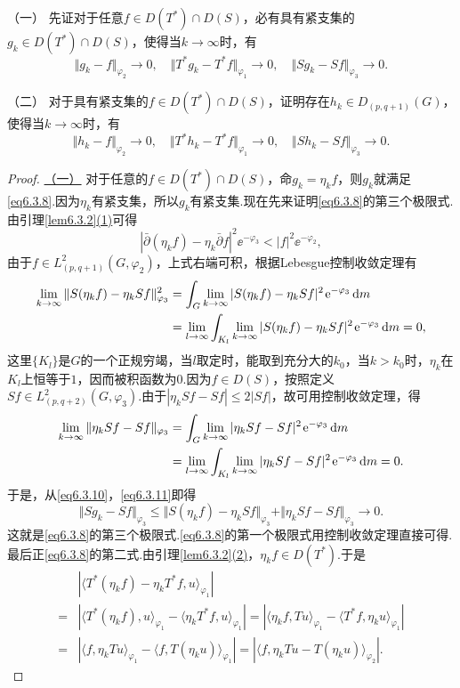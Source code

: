 （一）\hypertarget{6.3.4}{}
先证对于任意$f\in D(T^\ast)\cap D(S)$，必有具有紧支集的$g_k\in D(T^\ast)\cap D(S)$，使得当$k\to\infty$时，有
\begin{equation}\label{eq6.3.8}
	\Vert g_k-f\Vert_{\varphi_2}\to0,\quad\Vert T^\ast g_k-T^\ast f\Vert_{\varphi_1}\to0,\quad\Vert Sg_k-Sf\Vert_{\varphi_3}\to0.
\end{equation}

（二）\hypertarget{6.3.4}{}
对于具有紧支集的$f\in D(T^\ast)\cap D(S)$，证明存在$h_k\in D_{(p,q+1)}(G)$，使得当$k\to\infty$时，有
\begin{equation}\label{eq6.3.9}
	\Vert h_k-f\Vert_{\varphi_2}\to0,\quad\Vert T^\ast h_k-T^\ast f\Vert_{\varphi_1}\to0,\quad\Vert Sh_k-Sf\Vert_{\varphi_3}\to0.
\end{equation}
\begin{proof}
	\hyperlink{6.3.4}{（一）}
	对于任意的$f\in D(T^\ast)\cap D(S)$，命$g_k=\eta_k f$，则$g_k$就满足\eqref{eq6.3.8}.因为$\eta_k$有紧支集，所以$g_k$有紧支集.现在先来证明\eqref{eq6.3.8}的第三个极限式.由引理\ref{lem6.3.2}\hyperlink{6.3.2}{(1)}可得
	\[\left|\bar{\partial}(\eta_k f)-\eta_k\bar{\partial}f\right|^2\ee^{-\varphi_3}<|f|^2\ee^{-\varphi_2},\]
	由于$f\in L_{(p,q+1)}^2(G,\varphi_2)$，上式右端可积，根据Lebesgue控制收敛定理有
	\begin{align}\label{eq6.3.10}
		\lim_{k\to\infty}\Vert S(\eta_k f)-\eta_k Sf\Vert_{\varphi_3}^2
		&=\int_G\lim_{k\to\infty}|S(\eta_k f)-\eta_k Sf|^2\operatorname{\!\!\;\mathrm e}^{-\varphi_3}\mathop{}\!\mathrm{d} m\notag\\
		&=\lim_{l\to\infty}\int_{K_l}\lim_{k\to\infty}|S(\eta_k f)-\eta_k Sf|^2\operatorname{\!\!\;\mathrm e}^{-\varphi_3}\mathop{}\!\mathrm{d} m=0,
	\end{align}
这里$\{K_l\}$是$G$的一个正规穷竭，当$l$取定时，能取到充分大的$k_0$，当$k>k_0$时，$\eta_k$在$K_l$上恒等于$1$，因而被积函数为$0$.因为$f\in D(S)$，按照定义$Sf\in L_{(p,q+2)}^2(G,\varphi_3)$.由于$|\eta_k Sf-Sf|\le 2|Sf|$，故可用控制收敛定理，得
\begin{align}\label{eq6.3.11}
	\lim_{k\to\infty}\Vert \eta_k Sf-Sf\Vert_{\varphi_3}
	&=\int_G\lim_{k\to\infty}|\eta_k Sf-Sf|^2\operatorname{\!\!\;\mathrm e}^{-\varphi_3}\mathop{}\!\mathrm{d} m\notag\\
	&=\lim_{l\to\infty}\int_{K_l}\lim_{k\to\infty}|\eta_k Sf-Sf|^2\operatorname{\!\!\;\mathrm e}^{-\varphi_3}\mathop{}\!\mathrm{d} m=0.
\end{align}
于是，从\eqref{eq6.3.10}，\eqref{eq6.3.11}即得
\[\Vert Sg_k-Sf\Vert_{\varphi_3}\le\Vert S(\eta_k f)-\eta_k Sf\Vert_{\varphi_3}+\Vert \eta_k Sf-Sf\Vert_{\varphi_3}\to0.\]
这就是\eqref{eq6.3.8}的第三个极限式.\eqref{eq6.3.8}的第一个极限式用控制收敛定理直接可得.最后正\eqref{eq6.3.8}的第二式.由引理\ref{lem6.3.2}\hyperlink{6.3.2}{(2)}，$\eta_k f\in D(T^\ast)$.于是
\begin{align*}
	&|\langle T^\ast(\eta_k f)-\eta_k T^\ast f,u\rangle_{\varphi_1}|\\
	=&|\langle T^\ast(\eta_k f),u\rangle_{\varphi_1}-\langle \eta_k T^\ast f,u\rangle_{\varphi_1}|=|\langle \eta_k f,Tu\rangle_{\varphi_1}-\langle T^\ast f,\eta_k u\rangle_{\varphi_1}|\\
	=&|\langle f,\eta_k Tu\rangle_{\varphi_1}-\langle f,T(\eta_k u)\rangle_{\varphi_1}|=|\langle f,\eta_k Tu-T(\eta_k u)\rangle_{\varphi_2}|.
\end{align*}


\end{proof}
